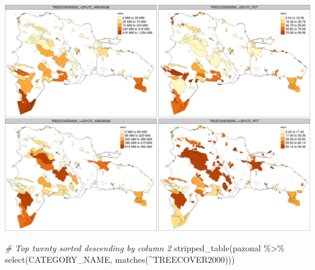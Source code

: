 \documentclass[10pt,landscape,a3paper]{article}
\newenvironment{Shaded}{\begin{snugshade}}{\end{snugshade}}
\newcommand{\CommentTok}[1]{\textcolor[rgb]{0.56,0.35,0.01}{\textit{#1}}}
\newcommand{\FunctionTok}[1]{\textcolor[rgb]{0.00,0.00,0.00}{#1}}
\newcommand{\NormalTok}[1]{#1}
\newcommand{\SpecialCharTok}[1]{\textcolor[rgb]{0.00,0.00,0.00}{#1}}
\newcommand{\StringTok}[1]{\textcolor[rgb]{0.31,0.60,0.02}{#1}}
\begin{document}
\begin{center}\includegraphics{img/data-download-preparation-eda/zonal-pa-1} \end{center}

\begin{Shaded}
\begin{Highlighting}[]
\CommentTok{\# Top twenty sorted descending by column 2}
\FunctionTok{stripped\_table}\NormalTok{(pazonal }\SpecialCharTok{\%\textgreater{}\%} \FunctionTok{select}\NormalTok{(CATEGORY\_NAME, }\FunctionTok{matches}\NormalTok{(}\StringTok{\textquotesingle{}\^{}TREECOVER2000\textquotesingle{}}\NormalTok{)))}
\end{Highlighting}
\end{Shaded}
\end{document}
